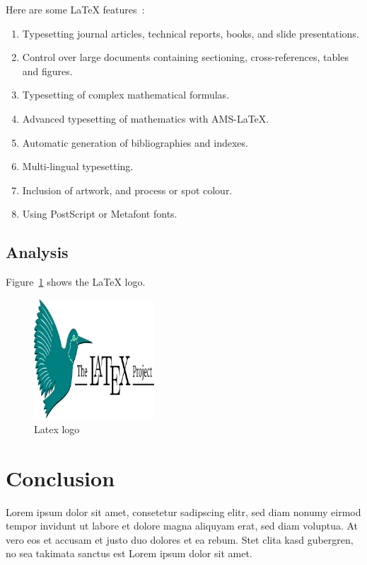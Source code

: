 \documentclass[12pt]{article}
\begin{document}
Here are some LaTeX features~\cite{latex-page}:

\begin{displayquote}
  \begin{enumerate}
    \item Typesetting journal articles, technical reports, books, and slide presentations.
    \item Control over large documents containing sectioning, cross-references, tables and figures.
    \item Typesetting of complex mathematical formulas.
    \item Advanced typesetting of mathematics with AMS-LaTeX.
    \item Automatic generation of bibliographies and indexes.
    \item Multi-lingual typesetting.
    \item Inclusion of artwork, and process or spot colour.
    \item Using PostScript or Metafont fonts.
  \end{enumerate}
\end{displayquote}

\subsection{Analysis}%

Figure~\ref{fig:-latex-logo} shows the \LaTeX{} logo.

\begin{figure}[htpb]
  \centering
  \includegraphics[width=0.4\textwidth]{./img/latex-project-logo.png}
  \caption{Latex logo}
  \label{fig:-latex-logo} %
\end{figure}

\section{Conclusion}%
\label{sec:conclusion}

Lorem ipsum dolor sit amet, consetetur sadipscing elitr, sed diam nonumy eirmod tempor invidunt ut labore et dolore magna aliquyam erat, sed diam voluptua. At vero eos et accusam et justo duo dolores et ea rebum. Stet clita kasd gubergren, no sea takimata sanctus est Lorem ipsum dolor sit amet.



\end{document}
